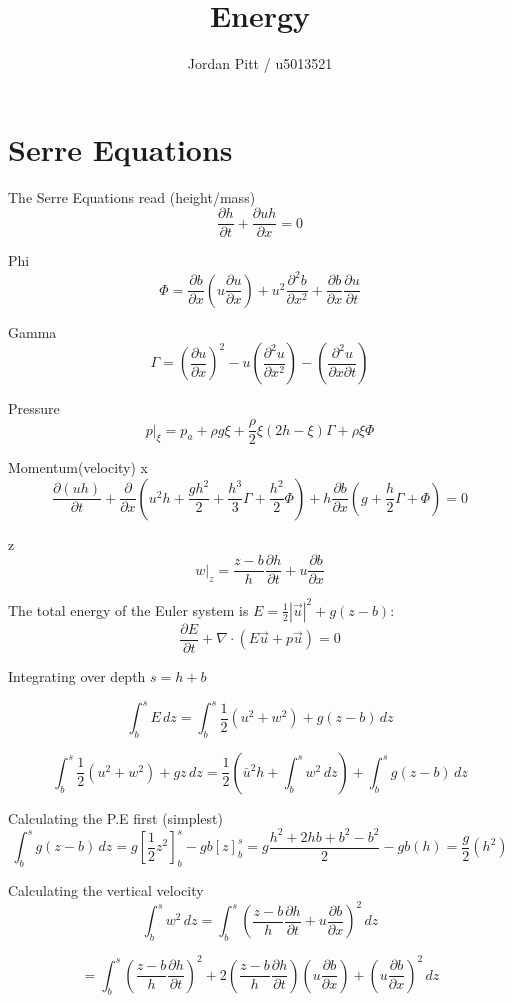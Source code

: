 \documentclass[12pt]{article}
\begin{document}
\title{Energy}
\author{Jordan Pitt / u5013521}

\section{Serre Equations}

The Serre Equations read
(height/mass)
\[\frac{\partial h}{\partial t} + \frac{\partial uh}{\partial x} = 0 \]

Phi
\[\Phi = \frac{\partial b}{\partial x}\left(u \frac{\partial u}{\partial x}\right) + u^2 \frac{\partial^2 b}{\partial x^2} + \frac{\partial b}{\partial x}\frac{\partial u}{\partial t}\]

Gamma
\[\Gamma = \left(\frac{\partial u}{\partial x} \right)^2 - u \left(\frac{\partial^2 u}{\partial x^2} \right) - \left(\frac{\partial^2 u}{\partial x \partial t} \right)\]

Pressure
\[p|_\xi = p_a + \rho g \xi + \frac{\rho}{2}\xi\left(2h - \xi\right)\Gamma + \rho \xi \Phi \]


Momentum(velocity)
x
\[ \frac{\partial (uh)}{\partial t} + \frac{\partial}{\partial x}\left(u^2 h + \frac{gh^2}{2} + \frac{h^3}{3}\Gamma + \frac{h^2}{2} \Phi\right) + h \frac{\partial b}{\partial x}\left(g + \frac{h}{2}\Gamma + \Phi\right) = 0\]

z
\[w|_z = \frac{z - b}{h} \frac{\partial h}{\partial t} + u \frac{\partial b}{\partial x}\]

The total energy of the Euler system is $E = \frac{1}{2} |\vec{u}|^2 + g(z-b)$:
\[\frac{\partial E}{\partial t} + \nabla \cdot \left(E\vec{u} + p\vec{u}\right) = 0\]

Integrating over depth $s = h + b$


\[\int_b^sE \, dz = \int_b^s \frac{1}{2}\left(u^2 + w^2\right) + g(z-b) \, dz\]

\[\int_b^s \frac{1}{2}\left(u^2+ w^2\right) + gz \, dz = \frac{1}{2}\left(\bar{u}^2h + \int_b^s  w^2 \, dz \right) + \int_b^s g(z-b)  \, dz \]

Calculating the P.E first (simplest)
\[\int_b^s g(z-b)  \, dz = g \left[\frac{1}{2}z^2\right]^s_b - gb\left[z\right]^s_b = g\frac{h^2 + 2hb + b^2 - b^2}{2} - gb(h) = \frac{g}{2}\left(h^2\right)\]

Calculating the vertical velocity
\[\int_b^s  w^2 \, dz = \int_b^s  \left(\frac{z - b}{h} \frac{\partial h}{\partial t} + u \frac{\partial b}{\partial x}\right)^2 \, dz \]

\[ = \int_b^s  \left(\frac{z - b}{h} \frac{\partial h}{\partial t}\right)^2 + 2\left(\frac{z - b}{h} \frac{\partial h}{\partial t}\right)\left(u \frac{\partial b}{\partial x}\right) + \left( u \frac{\partial b}{\partial x} \right)^2 \, dz  \]
\end{document}
